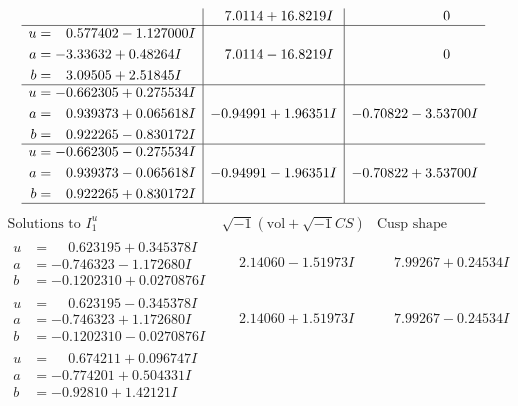 \documentclass[1p]{elsarticle_modified}
\theoremstyle{definition}
\newcommand{\I}{\sqrt{-1}}
\begin{document}
$$\begin{array}{c|c|c}
 & \phantom{-}7.0114 + 16.8219 I & \phantom{-0.000000 } 0 \\ \hline\begin{aligned}
u &= \phantom{-}0.577402 - 1.127000 I \\
a &= -3.33632 + 0.48264 I \\
b &= \phantom{-}3.09505 + 2.51845 I\end{aligned}
 & \phantom{-}7.0114 - 16.8219 I & \phantom{-0.000000 } 0 \\ \hline\begin{aligned}
u &= -0.662305 + 0.275534 I \\
a &= \phantom{-}0.939373 + 0.065618 I \\
b &= \phantom{-}0.922265 - 0.830172 I\end{aligned}
 & -0.94991 + 1.96351 I & -0.70822 - 3.53700 I \\ \hline\begin{aligned}
u &= -0.662305 - 0.275534 I \\
a &= \phantom{-}0.939373 - 0.065618 I \\
b &= \phantom{-}0.922265 + 0.830172 I\end{aligned}
 & -0.94991 - 1.96351 I & -0.70822 + 3.53700 I\\
 \hline 
 \end{array}$$\newpage$$\begin{array}{c|c|c}  
\text{Solutions to }I^u_{1}& \I (\text{vol} + \sqrt{-1}CS) & \text{Cusp shape}\\
 \hline 
\begin{aligned}
u &= \phantom{-}0.623195 + 0.345378 I \\
a &= -0.746323 - 1.172680 I \\
b &= -0.1202310 + 0.0270876 I\end{aligned}
 & \phantom{-}2.14060 - 1.51973 I & \phantom{-}7.99267 + 0.24534 I \\ \hline\begin{aligned}
u &= \phantom{-}0.623195 - 0.345378 I \\
a &= -0.746323 + 1.172680 I \\
b &= -0.1202310 - 0.0270876 I\end{aligned}
 & \phantom{-}2.14060 + 1.51973 I & \phantom{-}7.99267 - 0.24534 I \\ \hline\begin{aligned}
u &= \phantom{-}0.674211 + 0.096747 I \\
a &= -0.774201 + 0.504331 I \\
b &= -0.92810 + 1.42121 I\end{aligned}

\end{array}$$
\end{document}
